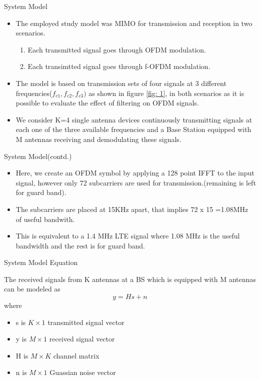 \documentclass{beamer}
\begin{document}
\begin{frame}{System Model}
    \begin{itemize}
        \item The employed study model was MIMO for transmission and reception in two scenarios.
        \begin{enumerate}
            \item Each transmitted signal goes through OFDM modulation.
            \item Each transimtted signal goes through f-OFDM modulation.
        \end{enumerate}
        \item The model is based on transmission sets of four signals at 3 different frequencies($f_{c1},f_{c2},f_{c3})$ as shown in figure \ref{fig: 1}, in both scenarios as it is possible to evaluate the effect of filtering on OFDM signals.
        \item We consider K=4 single antenna devices continuously transmitting signals at each one of the three available frequencies and a Base Station equipped with M antennas receiving and demodulating these signals.
    \end{itemize}
\end{frame}
\begin{frame}{System Model(contd.)}
    \begin{itemize}
        \item Here, we create an OFDM symbol by applying a 128 point IFFT to the input signal, however only 72 subcarriers are used for transmission.(remaining is left for guard band).
        \item The subcarriers are placed at 15KHz apart, that implies 72 x 15 =1.08MHz of useful bandwith.
        \item This is equivalent to a 1.4 MHz LTE signal where 1.08 MHz is the useful bandwidth and the rest is for guard band.
    \end{itemize}
\end{frame}
\begin{frame}{System Model Equation}
    \begin{block}{}
    The received signals from K antennas at a BS which is equipped with M antennas can be modeled as
    \begin{equation}
        y= Hs+n
    \end{equation}
    where
    \begin{itemize}
        \item s is $K \times 1$ transmitted signal vector
        \item y is $M \times 1$ received signal vector
        \item H is $M \times K$ channel matrix
        \item n is $M \times 1$ Guassian noise vector
    \end{itemize}
    \end{block}
    \end{frame}
\end{document}
